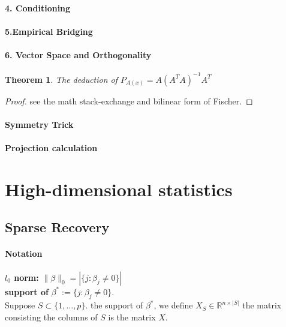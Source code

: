\documentclass[a4paper,12pt, oneside, fleqn]{book}
\newtheorem{theorem}{Theorem}[section]
\theoremstyle{definition}
\theoremstyle{remark}
\begin{document}
\subsubsection*{4. Conditioning}

\subsubsection*{5.Empirical Bridging}

\subsubsection*{6. Vector Space and Orthogonality}
\begin{theorem}
	The deduction of $P_{A(x)} = A(A^T A)^{-1} A^T$
\end{theorem}
\begin{proof}
	see the math stack-exchange and bilinear form of Fischer. 
\end{proof}



\subsubsection*{Symmetry Trick}

\subsubsection*{Projection calculation}












\chapter{High-dimensional statistics}

\section{Sparse Recovery}
\subsubsection*{Notation}
\textbf{$l_0$ norm:} $	\|\beta\|_0 = |\{j: \beta_j \neq 0\}|$\\
\textbf{support of} $\beta^*:= \{j: \beta_j \neq 0\}$. \\
Suppose $S \subset \{1, \dots, p \}$. the support of $\beta^*$, we define $X_S \in \mathbb{R}^{n \times |S|}$ the matrix consisting the columns of $S$ is the matrix $X$.
\end{document}
